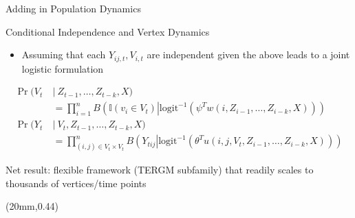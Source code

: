 \documentclass[10pt]{beamer}
\begin{document}
\begin{frame}{Adding in Population Dynamics}
\begin{block}{Conditional Independence and Vertex Dynamics}
\begin{itemize}
\item Assuming that each $Y_{ij,t}, V_{i,t}$ are independent given the above leads to a joint logistic formulation 
\end{itemize}
\scriptsize{
\begin{align*}
\Pr(V_t\: &|\:Z_{t-1},\dots,Z_{t-k},X) \\ &= \prod_{i=1}^n B\left(\mathbb{I}(v_i \in V_t)\left|\textrm{logit}^{-1} \left(\psi^T w(i,Z_{i-1},\dots,Z_{i-k},X)\right)\right.\right)  \\
\Pr(Y_t\: &|\: V_t, Z_{t-1},\dots,Z_{t-k},X)\\ &= \prod_{(i,j)\in V_t \times V_t}^n B\left(Y_{tij}\left|\textrm{logit}^{-1} \left(\theta^T u(i,j,V_t,Z_{i-1},\dots,Z_{i-k},X) \right)\right.\right)
\end{align*}
}
\end{block}

\begin{alertblock}{}
Net result: flexible framework (TERGM subfamily) that readily scales to thousands of vertices/time points
\end{alertblock}

\begin{textblock*}{3in}(20mm,0.44\textheight)

\fbox{%
\begin{minipage}[b][2.6cm][t]{8.5cm}
\hspace{6in}
\end{minipage}}

\end{textblock*}



\end{frame}
\end{document}
